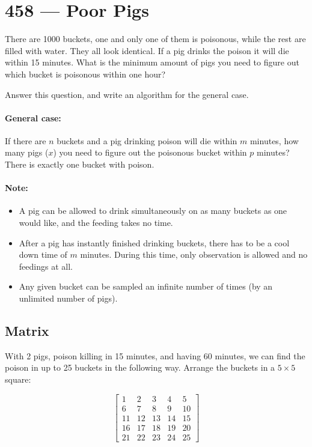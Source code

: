 \section{458 --- Poor Pigs}
There are 1000 buckets, one and only one of them is poisonous, while the rest are filled with water. They all look identical. If a pig drinks the poison it will die within 15 minutes. What is the minimum amount of pigs you need to figure out which bucket is poisonous within one hour?

Answer this question, and write an algorithm for the general case.

\paragraph{General case:}

\begin{flushleft}
If there are $n$ buckets and a pig drinking poison will die within $m$ minutes, how many pigs ($x$) you need to figure out the poisonous bucket within $p$ minutes? There is exactly one bucket with poison.
\end{flushleft}

 
\paragraph{Note:}

\begin{itemize}
\item A pig can be allowed to drink simultaneously on as many buckets as one would like, and the feeding takes no time.
\item After a pig has instantly finished drinking buckets, there has to be a cool down time of $
m$ minutes. During this time, only observation is allowed and no feedings at all.
\item Any given bucket can be sampled an infinite number of times (by an unlimited number of pigs).
\end{itemize}

\subsection{Matrix}
With 2 pigs, poison killing in 15 minutes, and having 60 minutes, we can find the poison in up to 25 buckets in the following way. Arrange the buckets in a $5\times 5$ square:

\[ 
\begin{bmatrix}
1 & 2 & 3 & 4 & 5 \\
6 & 7 & 8 & 9 & 10 \\
11 & 12 & 13 & 14 & 15 \\
16 & 17 & 18 & 19 & 20 \\
21 & 22 & 23 & 24 & 25
\end{bmatrix}
 \]
 
